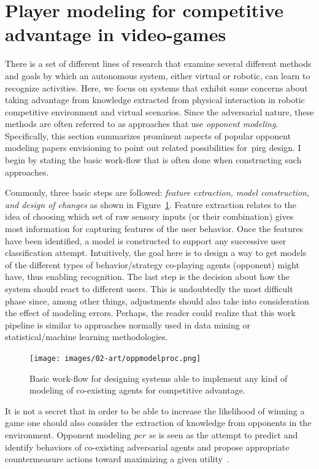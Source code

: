 \section{Player modeling for competitive advantage in video-games}\label{compadvantage}
There is a set of different lines of research that examine several different methods and goals by which an autonomous system, either virtual or robotic, can learn to recognize activities. Here, we focus on systems that exhibit some concerns about taking advantage from knowledge extracted from physical interaction in robotic competitive environment and virtual scenarios. Since the adversarial nature, these methods are often referred to as approaches that use \textit{opponent modeling}. Specifically, this section summarizes prominent aspects of popular opponent modeling papers envisioning to point out related possibilities for~\gls{pirg} design. I begin by stating the basic work-flow that is often done when constructing such approaches. 

Commonly, three basic steps are followed: \textit{feature extraction, model construction, and design of changes} as shown in Figure~\ref{behaviorModWorkFlow}. Feature extraction relates to the idea of choosing which set of raw sensory inputs (or their combination) gives most information for capturing features of the user behavior. Once the features have been identified, a model is constructed to support any successive user classification attempt. Intuitively, the goal here is to design a way to get models of the different types of behavior/strategy co-playing agents (opponent) might have, thus enabling recognition. The last step is the decision about how the system should react to different users. This is undoubtedly the most difficult phase since, among other things, adjustments should also take into consideration the effect of modeling errors. Perhaps, the reader could realize that this work pipeline is similar to approaches normally used in data mining or statistical/machine learning methodologies.

\begin{figure}[htp]
  \centering  
  \texttt{[image: images/02-art/oppmodelproc.png]}
  \caption{Basic work-flow for designing systems able to implement any kind of modeling of co-existing agents for competitive advantage.}
   \label{behaviorModWorkFlow}
\end{figure}

It is not a secret that in order to be able to increase the likelihood of winning a game one should also consider the extraction of knowledge from opponents in the environment. Opponent modeling \textit{per se} is seen as the attempt to predict and identify behaviors of co-existing adversarial agents and propose appropriate countermeasure actions toward maximizing a given utility~\citep{fathzadeh_opponent_2007}.

